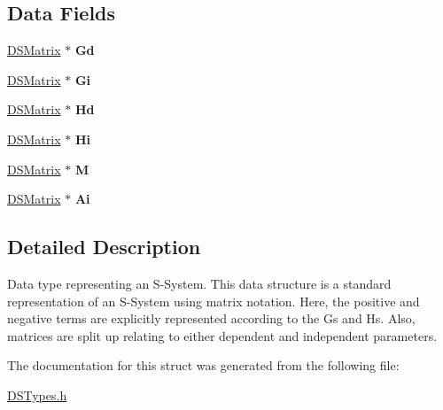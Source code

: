 \subsection*{Data Fields}
\begin{DoxyCompactItemize}
\item 
\hypertarget{struct_d_s_s_system_a9b4cbb7b74e363d29d8bb9286bd2cebb}{
\hyperlink{struct_d_s_matrix}{DSMatrix} $\ast$ {\bfseries Gd}}
\label{struct_d_s_s_system_a9b4cbb7b74e363d29d8bb9286bd2cebb}

\item 
\hypertarget{struct_d_s_s_system_a75132febb300c23365aac8c8aeea7cd5}{
\hyperlink{struct_d_s_matrix}{DSMatrix} $\ast$ {\bfseries Gi}}
\label{struct_d_s_s_system_a75132febb300c23365aac8c8aeea7cd5}

\item 
\hypertarget{struct_d_s_s_system_a0ce13baa657ac43255d2b5837f50df3d}{
\hyperlink{struct_d_s_matrix}{DSMatrix} $\ast$ {\bfseries Hd}}
\label{struct_d_s_s_system_a0ce13baa657ac43255d2b5837f50df3d}

\item 
\hypertarget{struct_d_s_s_system_ab94594d92720ee99410ddf151d7757f6}{
\hyperlink{struct_d_s_matrix}{DSMatrix} $\ast$ {\bfseries Hi}}
\label{struct_d_s_s_system_ab94594d92720ee99410ddf151d7757f6}

\item 
\hypertarget{struct_d_s_s_system_a8bfad635e3f986eb9fce52925d149caf}{
\hyperlink{struct_d_s_matrix}{DSMatrix} $\ast$ {\bfseries M}}
\label{struct_d_s_s_system_a8bfad635e3f986eb9fce52925d149caf}

\item 
\hypertarget{struct_d_s_s_system_a08641d45cd6f68a2f784268bf3e6d3cd}{
\hyperlink{struct_d_s_matrix}{DSMatrix} $\ast$ {\bfseries Ai}}
\label{struct_d_s_s_system_a08641d45cd6f68a2f784268bf3e6d3cd}

\end{DoxyCompactItemize}


\subsection{Detailed Description}
Data type representing an S-\/System. This data structure is a standard representation of an S-\/System using matrix notation. Here, the positive and negative terms are explicitly represented according to the Gs and Hs. Also, matrices are split up relating to either dependent and independent parameters. 

The documentation for this struct was generated from the following file:\begin{DoxyCompactItemize}
\item 
\hyperlink{_d_s_types_8h}{DSTypes.h}\end{DoxyCompactItemize}
